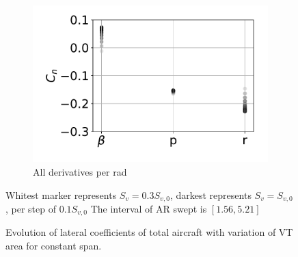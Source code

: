 \begin{figure}[hbt!]
\begin{subfigure}[b]{0.33\textwidth}
		\includegraphics[width=\textwidth]{CnCstSpan}
		\caption{All derivatives per rad}
		\label{fig:CnCstSpan}
	\end{subfigure}
	\caption{Evolution of lateral coefficients of total aircraft with variation of VT area for constant span.} Whitest marker represents $S_v=0.3S_{v,0}$, darkest represents $S_v=S_{v,0}$, per step of $0.1S_{v,0}$ The interval of AR swept is $[1.56,5.21]$\label{fig:cstSpan}
\end{figure}


